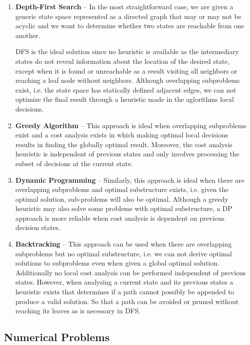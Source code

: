 \documentclass{article}
\begin{document}
    \begin{enumerate}
        \item \textbf{Depth-First Search} --
        In the most straightforward case, we are given a generic state space represented as a directed graph that may or may not be acyclic and we want to determine  whether two states are reachable from one another. 
        
        DFS is the ideal solution since no heuristic is available as the intermediary states do not reveal information about the location of the desired state, except when it is found or unreachable as a result visiting all neighbors or reaching a leaf node without neighbors. Although overlapping subproblems exist, i.e. the state space has statically defined adjacent edges, we can not optimize the final result through a heuristic made in the aglorithms local decisions.  
        
        \item \textbf{Greedy Algorithm} -- This approach is ideal when overlapping subproblems exist and a cost analysis exists in which making optimal local decisions results in finding the globally optimal result. Moreover, the cost analysis heuristic is independent of previous states and only involves processing the subset of decisions at the current state.

        \item \textbf{Dynamic Programming} --  Similarly, this approach is ideal when there are overlapping subproblems and optimal substructure exists, i.e. given the optimal solution, sub-problems will also be optimal. Although a greedy heuristic may also solve some problems with optimal substructure, a DP approach is more reliable when cost analysis is dependent on previous decision states.
        
        \item \textbf{Backtracking} -- This approach can be used when there are overlapping subproblems but no optimal substructure, i.e. we can not derive optimal solutions to subproblems even when given a global optimal solution. Additionally no local cost analysis can be performed independent of previous states. However, when analysing a current state and its previous states a heuristic exists that determines if a path cannot possibly be appended to produce a valid solution. So that a path can be avoided or pruned without reaching its leaves as is necessary in DFS.
    \end{enumerate}


    \subsection{Numerical Problems}
    
\end{document}

